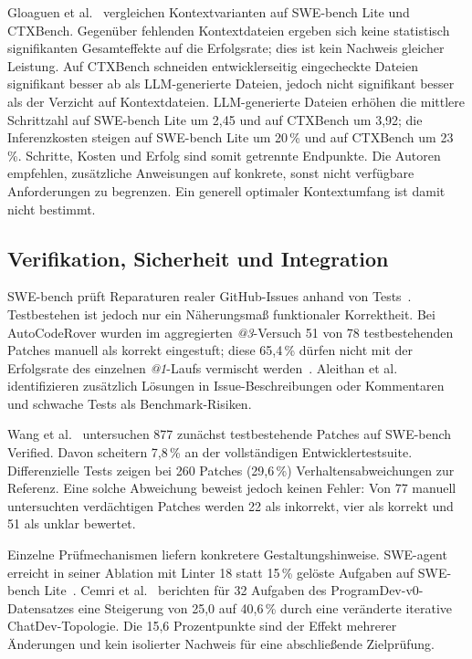 \documentclass[conference]{IEEEtran}
\begin{document}
Gloaguen et al.~\cite{gloaguen2026agentsmd} vergleichen Kontextvarianten auf SWE-bench Lite und CTXBench. Gegenüber fehlenden Kontextdateien ergeben sich keine statistisch signifikanten Gesamteffekte auf die Erfolgsrate; dies ist kein Nachweis gleicher Leistung. Auf CTXBench schneiden entwicklerseitig eingecheckte Dateien signifikant besser ab als LLM-generierte Dateien, jedoch nicht signifikant besser als der Verzicht auf Kontextdateien. LLM-generierte Dateien erhöhen die mittlere Schrittzahl auf SWE-bench Lite um 2,45 und auf CTXBench um 3,92; die Inferenzkosten steigen auf SWE-bench Lite um 20\,\% und auf CTXBench um 23\,\%. Schritte, Kosten und Erfolg sind somit getrennte Endpunkte. Die Autoren empfehlen, zusätzliche Anweisungen auf konkrete, sonst nicht verfügbare Anforderungen zu begrenzen. Ein generell optimaler Kontextumfang ist damit nicht bestimmt.

\subsection{Verifikation, Sicherheit und Integration}
SWE-bench prüft Reparaturen realer GitHub-Issues anhand von Tests~\cite{jimenez2024swebench}. Testbestehen ist jedoch nur ein Näherungsmaß funktionaler Korrektheit. Bei AutoCodeRover wurden im aggregierten \emph{@3}-Versuch 51 von 78 testbestehenden Patches manuell als korrekt eingestuft; diese 65,4\,\% dürfen nicht mit der Erfolgsrate des einzelnen \emph{@1}-Laufs vermischt werden~\cite{zhang2024autocoderover}. Aleithan et al.~\cite{aleithan2024swebenchplus} identifizieren zusätzlich Lösungen in Issue-Beschreibungen oder Kommentaren und schwache Tests als Benchmark-Risiken.

Wang et al.~\cite{wang2026solvedissues} untersuchen 877 zunächst testbestehende Patches auf SWE-bench Verified. Davon scheitern 7,8\,\% an der vollständigen Entwicklertestsuite. Differenzielle Tests zeigen bei 260 Patches (29,6\,\%) Verhaltensabweichungen zur Referenz. Eine solche Abweichung beweist jedoch keinen Fehler: Von 77 manuell untersuchten verdächtigen Patches werden 22 als inkorrekt, vier als korrekt und 51 als unklar bewertet.

Einzelne Prüfmechanismen liefern konkretere Gestaltungshinweise. SWE-agent erreicht in seiner Ablation mit Linter 18 statt 15\,\% gelöste Aufgaben auf SWE-bench Lite~\cite{yang2024sweagent}. Cemri et al.~\cite{cemri2025mast} berichten für 32 Aufgaben des ProgramDev-v0-Datensatzes eine Steigerung von 25,0 auf 40,6\,\% durch eine veränderte iterative ChatDev-Topologie. Die 15,6 Prozentpunkte sind der Effekt mehrerer Änderungen und kein isolierter Nachweis für eine abschließende Zielprüfung.
\end{document}
